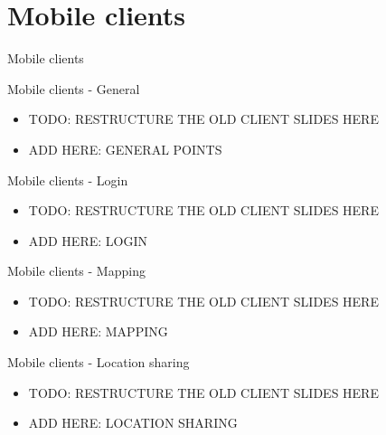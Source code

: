 \documentclass[11pt]{beamer}
\begin{document}
\section{Mobile clients}

\begin{frame}{}

  \begin{center}

    {\Huge Mobile clients}

  \end{center}

\end{frame}


\begin{frame}{Mobile clients - General}

  \begin{itemize}

    \item TODO: RESTRUCTURE THE OLD CLIENT SLIDES HERE
    \item ADD HERE: GENERAL POINTS

  \end{itemize}

\end{frame}


\begin{frame}{Mobile clients - Login}

  \begin{itemize}

    \item TODO: RESTRUCTURE THE OLD CLIENT SLIDES HERE
    \item ADD HERE: LOGIN

  \end{itemize}

\end{frame}


\begin{frame}{Mobile clients - Mapping}

  \begin{itemize}

    \item TODO: RESTRUCTURE THE OLD CLIENT SLIDES HERE
    \item ADD HERE: MAPPING

  \end{itemize}

\end{frame}


\begin{frame}{Mobile clients - Location sharing}

  \begin{itemize}

    \item TODO: RESTRUCTURE THE OLD CLIENT SLIDES HERE
    \item ADD HERE: LOCATION SHARING

  \end{itemize}

\end{frame}
\end{document}
